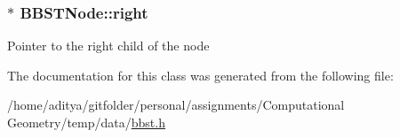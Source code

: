\subsubsection[{right}]{$\ast$ B\+B\+S\+T\+Node\+::right}\label{class_b_b_s_t_node_ab8a78bee2fb0aa4e7e6d2feb8be28268}
Pointer to the right child of the node 

The documentation for this class was generated from the following file\+:\begin{DoxyCompactItemize}
\item 
/home/aditya/gitfolder/personal/assignments/\+Computational Geometry/temp/data/\hyperlink{bbst_8h}{bbst.\+h}\end{DoxyCompactItemize}
